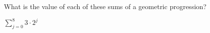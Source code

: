 
%
%
%

	What is the value of each of these sums of a geometric progression?
	\begin{subproblem}
		\item $\sum\limits_{j=0}^8 3 \cdot 2^j$
	\end{subproblem}

\solution
	\begin{subproblem}
		\item 
	\end{subproblem}
